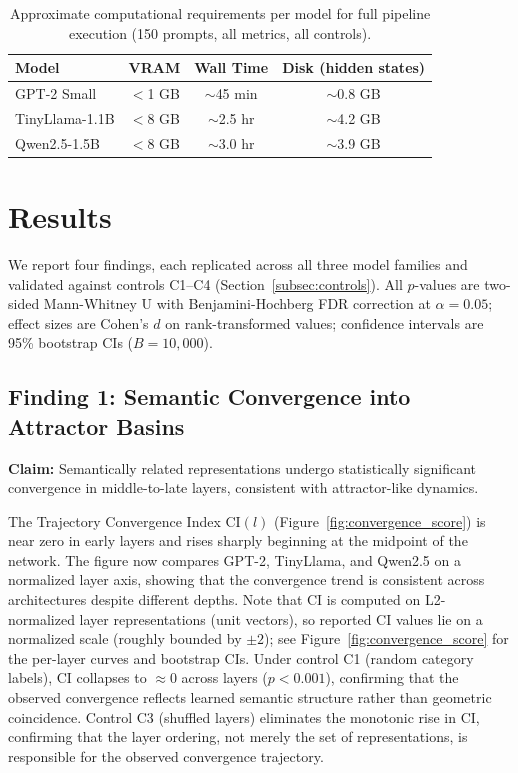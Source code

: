 \documentclass{article}
\begin{document}
\begin{table}[htbp]
\centering
\caption{Approximate computational requirements per model for full pipeline execution (150 prompts, all metrics, all controls).}
\label{tab:compute}
\begin{tabular}{lccc}
\toprule
\textbf{Model} & \textbf{VRAM} & \textbf{Wall Time} 
    & \textbf{Disk (hidden states)} \\
\midrule
GPT-2 Small    & $<$1 GB  & $\sim$45 min  & $\sim$0.8 GB \\
TinyLlama-1.1B & $<$8 GB  & $\sim$2.5 hr  & $\sim$4.2 GB \\
Qwen2.5-1.5B   & $<$8 GB  & $\sim$3.0 hr  & $\sim$3.9 GB \\
\bottomrule
\end{tabular}
\end{table}


\section{Results}
\label{sec:results}

We report four findings, each replicated across all three model 
families and validated against controls C1--C4 (Section~\ref{subsec:controls}). All $p$-values are two-sided  Mann-Whitney U with Benjamini-Hochberg FDR correction at $\alpha = 0.05$; effect sizes are Cohen's $d$ on rank-transformed values; confidence intervals are 95\% bootstrap CIs ($B = 10{,}000$).

\subsection{Finding 1: Semantic Convergence into Attractor Basins}
\label{subsec:result_convergence}

\textbf{Claim:} Semantically related representations undergo statistically significant convergence in middle-to-late layers, consistent with attractor-like dynamics.

The Trajectory Convergence Index $\text{CI}(l)$ (Figure~\ref{fig:convergence_score}) is near zero in early layers and rises sharply beginning at the midpoint of the network. The figure now compares GPT-2, TinyLlama, and Qwen2.5 on a normalized layer axis, showing that the convergence trend is consistent across architectures despite different depths. Note that CI is computed on L2-normalized layer representations (unit vectors), so reported CI values lie on a normalized scale (roughly bounded by $\pm2$); see Figure~\ref{fig:convergence_score} for the per-layer curves and bootstrap CIs. Under control C1 (random category labels), CI collapses to $\approx 0$ across layers ($p < 0.001$), confirming that the observed convergence reflects learned semantic structure rather than geometric coincidence. Control C3 (shuffled layers) eliminates the monotonic rise in CI, confirming that the layer ordering, not merely the set of representations, is responsible for the observed convergence trajectory.
\end{document}

